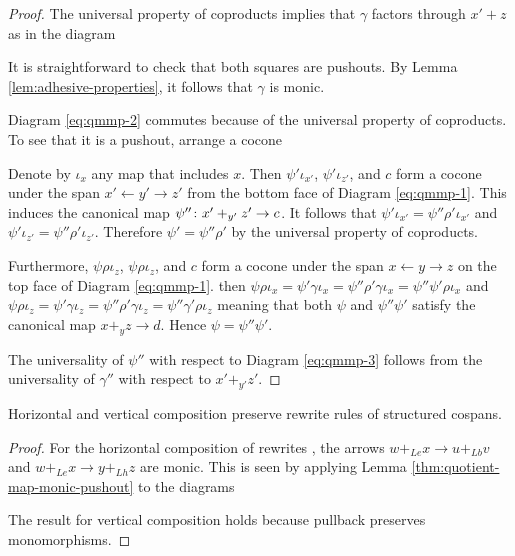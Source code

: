 \documentclass{amsart}
\begin{document}
\begin{proof}
  The universal property of coproducts implies
  that $ \gamma $ factors through $ x' + z $ as in
  the diagram 
   
  It is straightforward to check that both squares are
  pushouts. By Lemma \ref{lem:adhesive-properties}, it
  follows that $ \gamma $ is monic.

  Diagram \ref{eq:qmmp-2} commutes because of the universal
  property of coproducts.  To see that it is a pushout,
  arrange a cocone
  
  
  Denote by $ \iota_x $ any map that includes $ x $.  Then
  $ \psi' \iota_{x'} $, $ \psi' \iota_{z'} $, and $ c $ form
  a cocone under the span $ x' \gets y' \to z' $ from the
  bottom face of Diagram \ref{eq:qmmp-1}. This induces the
  canonical map $ \psi'' \colon x'+_{y'} z' \to c $. It
  follows that
  $ \psi' \iota_{x'} = \psi'' \rho' \iota_{x'} $ and
  $ \psi' \iota_{z'} = \psi'' \rho' \iota_{z'} $. Therefore
  $ \psi' = \psi'' \rho' $ by the universal property of
  coproducts.

  Furthermore, $ \psi \rho \iota_z $,
  $ \psi \rho \iota_z $, and $ c $ form a cocone
  under the span $ x \gets y \to z $ on the top
  face of Diagram \ref{eq:qmmp-1}. then
  $ \psi \rho \iota_x = \psi' \gamma \iota_x =
  \psi'' \rho' \gamma \iota_x = \psi'' \psi' \rho
  \iota_x $ and
  $ \psi \rho \iota_z = \psi' \gamma \iota_z =
  \psi'' \rho' \gamma \iota_z = \psi'' \gamma'
  \rho \iota_z $ meaning that both $ \psi $ and
  $ \psi'' \psi' $ satisfy the canonical map
  $ x+_yz \to d $. Hence $ \psi = \psi'' \psi' $.

  The universality of $ \psi'' $ with respect to
  Diagram \ref{eq:qmmp-3} follows from the
  universality of $ \gamma'' $ with respect to
  $ x'+_{y'}z' $.
\end{proof}

\begin{proposition} \label{thm:comp-preserve-monic}
  Horizontal and vertical composition preserve rewrite rules
  of structured cospans.
\end{proposition}

\begin{proof}
  For the horizontal composition of
  rewrites , the arrows 
  $ w +_{Le} x \to u+_{Lb} v $ and
  $ w +_{Le} x \to y +_{Lh} z $ are monic. This is seen by applying
  Lemma \ref{thm:quotient-map-monic-pushout} to the diagrams
  
  
  The result for vertical composition holds because pullback
  preserves monomorphisms.

\end{proof}
\end{document}
